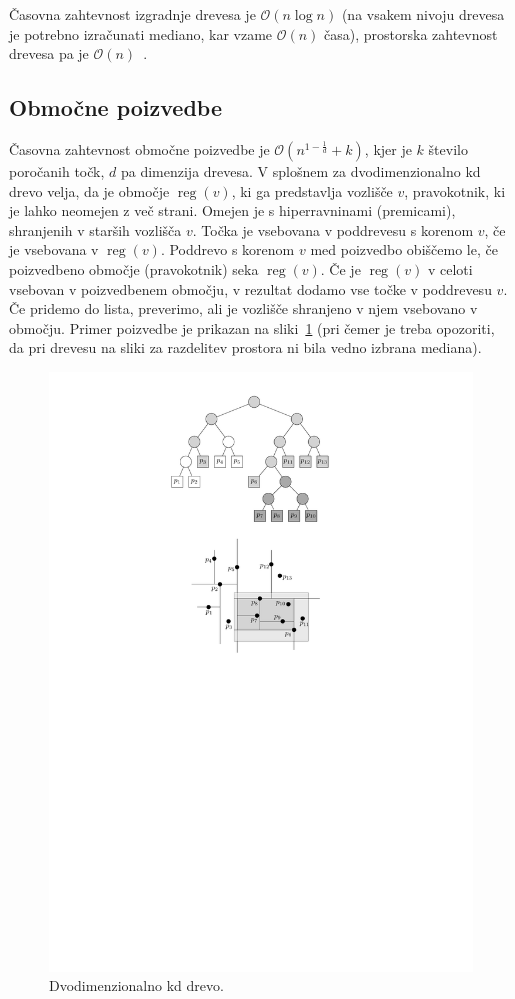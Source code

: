 \documentclass[a4paper, 12pt]{book}
\newcommand{\OO}{\ensuremath{\mathcal{O}}} %
\begin{document}
Časovna zahtevnost izgradnje drevesa je $\OO(n\log n)$ (na vsakem nivoju drevesa je potrebno izračunati mediano, kar vzame $\OO(n)$ časa), prostorska zahtevnost drevesa pa je $\OO(n)$~\cite[poglavje~5.2]{bkos-08-all}.
\subsection{Območne poizvedbe}
Časovna zahtevnost območne poizvedbe je $\OO(n^{1-\frac{1}{d}} + k)$, kjer je $k$ število poročanih točk, $d$ pa dimenzija drevesa. V splošnem za dvodimenzionalno kd drevo velja, da je območje $\operatorname{reg}(v)$, ki ga predstavlja vozlišče $v$, pravokotnik, ki je lahko neomejen z več strani. Omejen je s hiperravninami (premicami), shranjenih v starših vozlišča $v$. Točka je vsebovana v poddrevesu s korenom $v$, če je vsebovana v $\operatorname{reg}(v)$. Poddrevo s korenom $v$ med poizvedbo obiščemo le, če poizvedbeno območje (pravokotnik) seka $\operatorname{reg}(v)$. Če
je $\operatorname{reg}(v)$ v celoti vsebovan v poizvedbenem območju, v rezultat dodamo vse točke v poddrevesu $v$. Če pridemo do lista, preverimo, ali je vozlišče shranjeno v njem vsebovano v območju. Primer poizvedbe je prikazan na sliki~\ref{kd-primer} (pri čemer je treba opozoriti, da pri drevesu na sliki za razdelitev prostora ni bila vedno izbrana mediana).

\begin{figure}[htp]
\centerline{\includegraphics[scale=1.2]{pics/kdTree4.pdf}}		
\caption{Dvodimenzionalno kd drevo.}		
\label{kd-primer}		
\end{figure}
\end{document}
